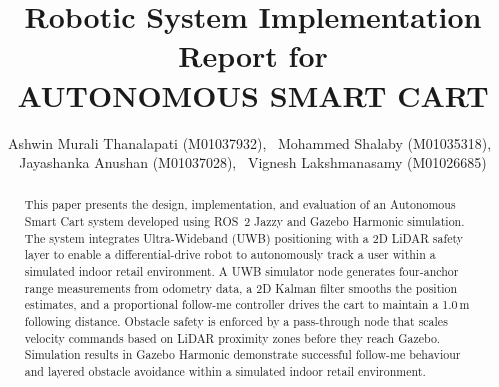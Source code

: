 \documentclass[journal,twocolumn]{IEEEtran}
\begin{document}
\title{Robotic System Implementation Report for \\ AUTONOMOUS SMART CART}

\author{
  Ashwin Murali Thanalapati (M01037932),~
  Mohammed Shalaby (M01035318),~
  Jayashanka Anushan (M01037028),~
  Vignesh Lakshmanasamy (M01026685)\\
}

\maketitle

\begin{abstract}
This paper presents the design, implementation, and evaluation of an
Autonomous Smart Cart system developed using ROS~2 Jazzy and Gazebo
Harmonic simulation. The system integrates Ultra-Wideband (UWB)
positioning with a 2D LiDAR safety layer to enable a differential-drive
robot to autonomously track a user within a simulated indoor retail
environment. A UWB simulator node generates four-anchor range measurements
from odometry data, a 2D Kalman filter smooths the position estimates,
and a proportional follow-me controller drives the cart to maintain a
1.0\,m following distance. Obstacle safety is enforced by a pass-through
node that scales velocity commands based on LiDAR proximity zones before
they reach Gazebo. Simulation results in Gazebo Harmonic demonstrate
successful follow-me behaviour and layered obstacle avoidance within a
simulated indoor retail environment.
\end{abstract}

\IEEEpeerreviewmaketitle












\end{document}
